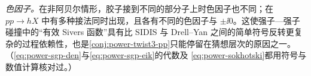 \begin{example}[最低阶的软胶子极点机制]
\emph{色因子。}在非阿贝尔情形，胶子接到不同的部分子上时色因子也不同；在 $pp\to hX$ 中有多种接法同时出现，且各有不同的色因子与 $\pm\ii0$。这使强子—强子碰撞中的“有效 Sivers 函数”具有比 SIDIS 与 Drell--Yan 之间的简单符号反转更复杂的过程依赖性，也是\cref{conj:power-twist3-pp}只能停留在猜想层次的原因之一。
（\eqref{eq:power-sgp-den}与\eqref{eq:power-sgp-eik}的代数及 \eqref{eq:power-sokhotski}都用符号与数值计算核对过。）
\end{example}

